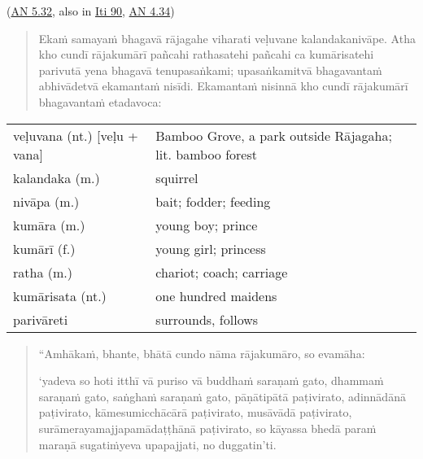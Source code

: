 \documentclass[11pt,oneside]{memoir}
\begin{document}
(\href{https://suttacentral.net/an5.32/en/sujato}{AN 5.32}, also in \href{https://suttacentral.net/iti90/en/thanissaro}{Iti 90}, \href{https://suttacentral.net/an4.34/en/sujato}{AN 4.34})

\begin{quote}
Ekaṁ samayaṁ bhagavā rājagahe viharati veḷuvane kalandakanivāpe. Atha kho cundī
rājakumārī pañcahi rathasatehi pañcahi ca kumārisatehi parivutā yena bhagavā
tenupasaṅkami; upasaṅkamitvā bhagavantaṁ abhivādetvā ekamantaṁ nisīdi. Ekamantaṁ
nisinnā kho cundī rājakumārī bhagavantaṁ etadavoca:
\end{quote}

\begin{longtable}{L{\colOne} L{\colTwo}}
veḷuvana (nt.) [veḷu + vana] & Bamboo Grove, a park outside Rājagaha; lit. bamboo forest\\[0pt]
kalandaka (m.) & squirrel\\[0pt]
nivāpa (m.) & bait; fodder; feeding\\[0pt]
kumāra (m.) & young boy; prince\\[0pt]
kumārī (f.) & young girl; princess\\[0pt]
ratha (m.) & chariot; coach; carriage\\[0pt]
kumārisata (nt.) & one hundred maidens\\[0pt]
parivāreti & surrounds, follows\\[0pt]
\end{longtable}


\vspace*{-2\baselineskip}
\enlargethispage{2\baselineskip}

\begin{quote}
“Amhākaṁ, bhante, bhātā cundo nāma rājakumāro, so evamāha:

‘yadeva so hoti itthī vā puriso vā
buddhaṁ saraṇaṁ gato, dhammaṁ saraṇaṁ gato, saṅghaṁ saraṇaṁ gato,
pāṇātipātā paṭivirato, adinnādānā paṭivirato, kāmesumicchācārā paṭivirato,
musāvādā paṭivirato, surāmerayamajjapamādaṭṭhānā paṭivirato,
so kāyassa bhedā paraṁ maraṇā sugatiṁyeva upapajjati, no duggatin’ti.
\end{quote}
\end{document}
